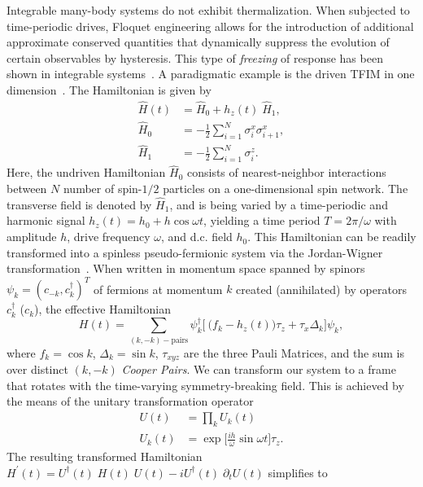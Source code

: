 \documentclass[%
reprint,
superscriptaddress,
amsmath,amssymb,
aps,
prb,
showkeys,
]{revtex4-2}
\begin{document}
Integrable many-body systems do not exhibit thermalization. When subjected to time-periodic drives, Floquet engineering allows for the introduction of additional approximate conserved quantities that dynamically suppress the evolution of certain observables by hysteresis. This type of \textit{freezing} of response
has been shown in integrable systems~\cite{roy_fate_2015}.
A paradigmatic example is  the driven TFIM in one dimension~\cite{stinchcombe_ising_1973}. The Hamiltonian is given by
\begin{align}
	\label{eq:tfim:hamilt}
	\hat{H}(t) &= \hat{H}_0 + h_z(t) \; \hat{H}_1,\\
	\hat{H}_0 &= -\frac{1}{2}\sum^N_{i=1} \sigma^x_i \sigma^x_{i+1},\\
	\hat{H}_1 &= -\frac{1}{2}\sum_{i=1}^N \sigma^z_{i}.
\end{align}
Here, the undriven Hamiltonian $\hat{H}_0$ consists of nearest-neighbor interactions between $N$ number of  spin-$1/2$ particles on a one-dimensional spin network. The transverse field is denoted by $\hat{H}_1$, and is being varied by a time-periodic and harmonic signal $h_z(t) = h_0 + h\cos{\omega t}$, yielding a time period $T=2\pi/\omega$ with amplitude $h$, drive frequency $\omega$, and d.c. field $h_0$. This Hamiltonian can be readily transformed into a spinless pseudo-fermionic system via the Jordan-Wigner transformation~\cite{mbeng_quantum_2020}. When written in momentum space spanned by spinors $\psi_k = (c_{-k}, c^\dagger_k)^T$ of fermions at momentum $k$ created (annihilated) by operators $c^\dagger_k$ ($c_k$), the effective Hamiltonian
\begin{equation}
	\label{eq:TFIM:fermions}
	H(t) = \sum_{(k,-k)-\mbox{pairs}} \psi^\dagger_k
	\Bigg[\ \bigg(f_k - h_z(t)\bigg)\tau_z +  \tau_x \Delta_k\Bigg]\psi_k ,
\end{equation}
where $f_k = \cos{k}$, $\Delta_k = \sin{k}$, $\tau_{xyz}$ are the three Pauli Matrices, and the sum is over distinct $(k, -k)$ \textit{Cooper Pairs}. We can transform our system to a frame that rotates with the time-varying symmetry-breaking field. This is achieved by the means of the unitary transformation operator~\cite{Engelhardt2013}
\begin{align}
	\label{eq:rotation:tfim}
	U(t) &= \prod_k U_k(t)\\
	U_k(t) &= \exp{\Big[\frac{i h}{\omega}\sin{\omega t}\Big]\tau_z}.\nonumber
\end{align} 
The resulting transformed Hamiltonian $H^\prime(t) = U^\dagger(t)\;H(t)\;U(t)-iU^\dagger(t)\;\partial_tU(t)$ simplifies to
\end{document}
